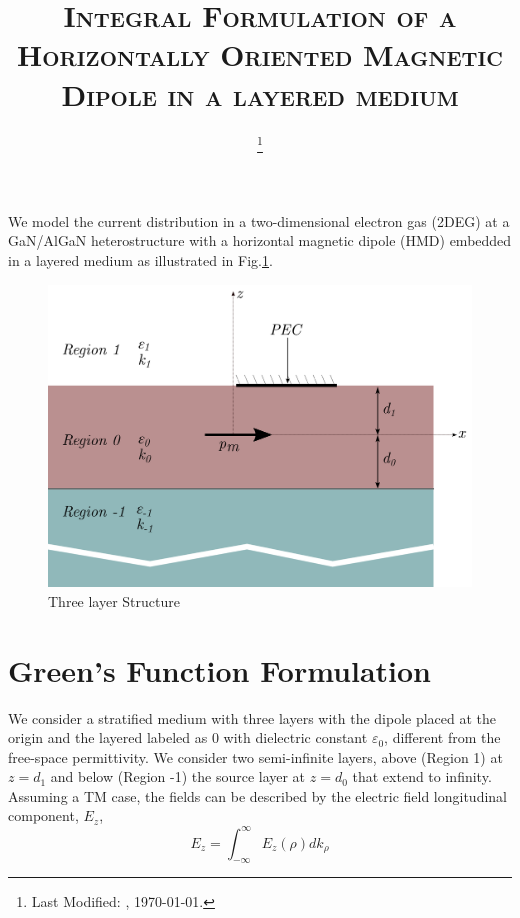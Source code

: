 \documentclass[11pt]{article}
\begin{document}
  \title{\textsc{Integral Formulation of a Horizontally Oriented Magnetic Dipole in a layered medium}\\}
  \date{\footnote{Last Modified: \currenttime, \today.}}
  \maketitle

  We model the current distribution in a two-dimensional electron gas (2DEG) at a GaN/AlGaN heterostructure with a horizontal magnetic dipole (HMD) embedded in a layered medium as illustrated in Fig.\ref{fig:illustration}.

  \begin{figure}[h]
    \includegraphics[width=12cm]{Gated_2DEG_structure}
    \centering
    \caption{Three layer Structure}
    \label{fig:illustration}
  \end{figure}
  
  \section{Green's Function Formulation}

  We consider a stratified medium with three layers with the dipole placed at the origin and the layered labeled as $0$ with dielectric constant $\varepsilon_0$, different from the free-space permittivity. We consider two semi-infinite layers, above (Region 1) at $z=d_1$ and below (Region -1) the source layer at $z=d_0$ that extend to infinity. Assuming a TM case, the fields can be described by the electric field longitudinal component, $E_z$,
  \begin{equation}
    E_z = \int_{-\infty}^{\infty} E_z(\rho) dk_{\rho}
    \label{eq:Ez}
  \end{equation}
\end{document}
